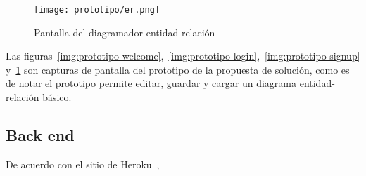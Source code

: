 \begin{figure}[H] 
    \centering
    \texttt{[image: prototipo/er.png]}
    \caption{Pantalla del diagramador entidad-relación}
    \label{img:prototipo-er}
\end{figure}



Las figuras~\ref{img:prototipo-welcome},~\ref{img:prototipo-login},~\ref{img:prototipo-signup} y~\ref{img:prototipo-er} son capturas de pantalla del prototipo de la propuesta de solución, como es de notar el prototipo permite editar, guardar y cargar un diagrama entidad-relación básico.


\subsection*{Back end}


De acuerdo con el sitio de Heroku~\cite{heroku_heroku_2020}, 